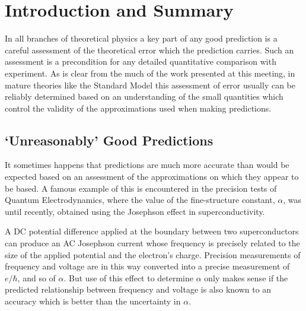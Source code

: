 \maketitle{}

\section{Introduction and Summary}

In all branches of theoretical physics a key part of any good
prediction is a careful assessment of the theoretical error which
the prediction carries. Such an assessment is a precondition for any
detailed quantitative comparison with experiment. As is 
clear from the much of the work presented at this meeting, in mature
theories like the Standard Model this assessment of error usually can
be reliably determined based on an understanding of
the small quantities which control the validity of the approximations
used when making predictions. 

\subsection{`Unreasonably' Good Predictions}

It sometimes happens that predictions are much more accurate
than would be expected based on an assessment of 
the approximations on which they appear to be based. A
famous example of this is encountered in the precision tests of
Quantum Electrodynamics, where the value of the
fine-structure constant, $\alpha$, was until recently, 
obtained using the Josephson effect in superconductivity.

A DC potential difference applied at the boundary between 
two superconductors can produce an AC Josephson current whose
frequency is precisely related to the size of the applied
potential and the electron's charge. Precision measurements
of frequency and voltage are in this way converted into
a precise measurement of $e/\hbar$, and so of $\alpha$.
But use of this effect to determine $\alpha$ 
only makes sense if the predicted relationship between
frequency and voltage is also known to an
accuracy which is better than the uncertainty in $\alpha$. 

